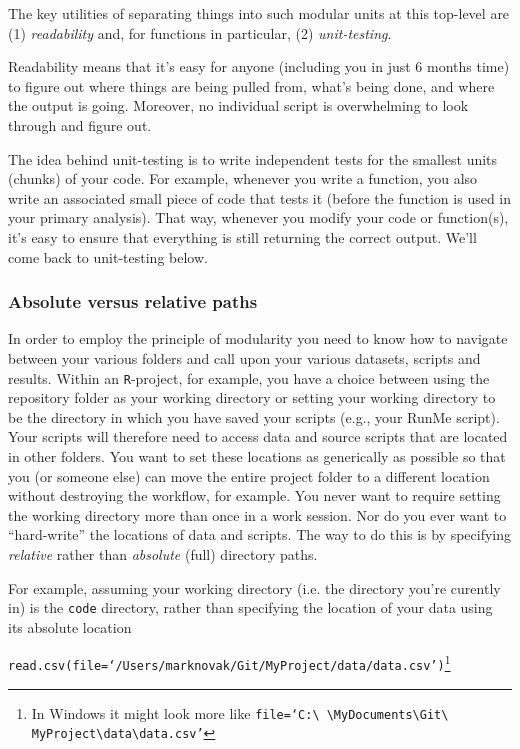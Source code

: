 \documentclass[12pt,letterpaper]{article}
\begin{document}
The key utilities of separating things into such modular units at this top-level are (1) 
\emph{readability} and, for functions in particular,
(2) \emph{unit-testing}.

Readability means that it's easy for anyone (including you in just 6 months time) to figure out where 
things are being pulled from, what's being done, and where the output is going. Moreover, no 
individual script is overwhelming to look through and figure out.

The idea behind unit-testing is to write independent tests for the smallest units (chunks) of your 
code.
For example, whenever you write a function, you also write an associated small piece of code that 
tests it (before the function is used in your primary analysis).
That way, whenever you modify your code or function(s), it's easy to ensure that everything is still 
returning the correct output.
We'll come back to unit-testing below.


\subsubsection{Absolute versus relative paths}
In order to employ the principle of modularity you need to know how to navigate between your 
various folders and call upon your various datasets, scripts and results.
Within an \texttt{R}-project, for example, you have a choice between using the repository folder as 
your working directory or setting your working directory to be the directory in which you have saved 
your scripts (e.g., your RunMe script).
Your scripts will therefore need to access data and source scripts that are located in other folders.
You want to set these locations as generically as possible so that you (or someone else) can move 
the entire project folder to a different location without destroying the workflow, for example.
You never want to require setting the working directory more than once in a work session.
Nor do you ever want to ``hard-write'' the locations of data and scripts.
The way to do this is by specifying \emph{relative} rather than \emph{absolute} (full) directory paths.

For example, assuming your working directory (i.e. the directory you're curently in) is the 
\texttt{code} directory, rather than specifying the location of your data using its absolute location

\texttt{read.csv(file=`/Users/marknovak/Git/MyProject/data/data.csv')}\footnote{In
 Windows it might look more like \texttt{file=`C:\textbackslash 
\textbackslash MyDocuments\textbackslash Git\textbackslash 
MyProject\textbackslash data\textbackslash data.csv'}}
\end{document}
